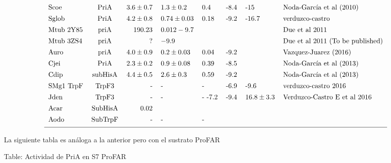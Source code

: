 \documentclass[12pt,twoside]{reedthesis}
\begin{document}
{\[{\begin{tabular}{ l c r l l l l l}
  Scoe        &PriA   &$  3.6\pm0.7     $&$ 1.3\pm0.2     $  &0.4                   &-8.4   &-15       &Noda-García et al (2010)\\ [1ex]
  Sglob       &PriA   & $4.2\pm0.8     $ & $0.74\pm0.03    $   &0.18                  &-9.2     &-16.7       &verduzco-castro\\ [1ex]
  Mtub 2Y85   &priA   &$  19  0.23      $&$0.012  -9.7          $&                      &       &          &Due et al 2011\\ [1ex]
  Mtub 3ZS4   &priA   &$  ?                 $&$-9.9               $&                      &       &          &Due et al 2011 (To be published)\\ [1ex]
  Auro        &priA   &$  4.0 \pm 0.9 $&$0.2 \pm 0.03   $&0.04                    &-9.2       &          &Vazquez-Juarez (2016)\\ [1ex]
  Cjei        &PriA   &$  2.3 \pm 0.2 $&$0.9 \pm 0.08   $&0.39                    &-8.5       &          &Noda-García et al (2013)\\ [1ex]
  Cdip        &subHisA&$  4.4 \pm 0.5 $&$2.6 \pm 0.3      $&0.59                  &-9.2       &          &Noda-García et al (2013)\\ [1ex]
  SMg1 TrpF   &TrpF3  &   -                &-                &-                       &-6.9     &-9.6      &verduzco-castro 2016\\ [1ex]
  Jden        &TrpF3  &   -                &-                &-          -7.2         &-9.4     &$16.8\pm3.3$&    Verduzco-Castro E et al  2016\\ [1ex]
  Acar      &SubHisA& 0.02                     &                 &                        &       &          &            \\ [1ex]
  Aodo        &SubTrpF&       -              &-                  &-                     &       &          &\\ [1ex]
  \hline
  \end{tabular}}
  \label{tab:PriAPRA}  
  \]
  
  \clearpage   La siguiente tabla es análoga a la anterior pero con el
  sustrato ProFAR
  
  Table: Actividad de PriA en S7 ProFAR \label{tab:PriAProFAR}
  
}
\end{document}
